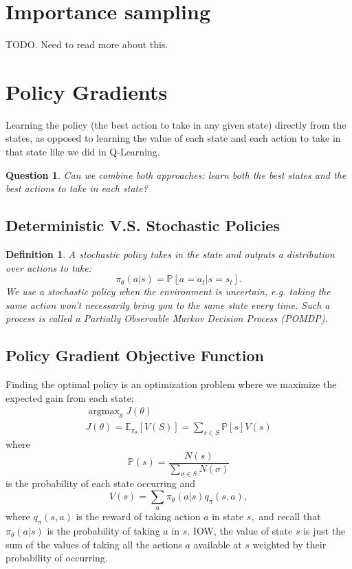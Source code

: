 \documentclass[20pt]{extarticle}
\theoremstyle{plain}
\newtheorem{question}[theorem]{Question}
\newtheorem{definition}[theorem]{Definition}
\theoremstyle{definition}
\theoremstyle{remark}
\DeclareMathOperator{\argmax}{argmax}
\newcommand{\hE}{\mathbb E}
\newcommand{\hP}{\mathbb P}
\newcommand{\0}{\varnothing}
\newcommand{\<}{\langle}
\renewcommand{\>}{\rangle}
\begin{document}
\section{Importance sampling}

TODO. Need to read more about this.


\section{Policy Gradients}

Learning the policy (the best action to take in any given state) directly from the states, as opposed to learning the value of each state and each action to take in that state like we did in Q-Learning.

\begin{question}
  Can we combine both approaches: learn both the best states and the best actions to take in each state?
\end{question}

\subsection{Deterministic V.S. Stochastic Policies}

\begin{definition}
  A stochastic policy takes in the state and outputs a distribution over actions to take: $$
  \pi_\theta(a|s) = \hP[a = a_t | s = s_t].
$$ We use a stochastic policy when the environment is uncertain, e.g. taking the same action won't necessarily bring you to the same state every time. Such a process is called a Partially Observable Markov Decision Process (POMDP).
\end{definition}

\subsection{Policy Gradient Objective Function}

Finding the optimal policy is an optimization problem where we maximize the expected gain from each state:
\begin{gather*}
\argmax_\theta  J(\theta) \\
J(\theta) = \hE_{\pi_\theta}[V(S)] = \sum_{s\in S} \hP[s] V(s)
\end{gather*}
where $$
  \hP(s) = \frac{N(s)}{\sum_{\sigma\in S} N(\sigma)}
$$
is the probability of each state occurring and $$
  V(s) = \sum_{a} \pi_\theta(a|s) q_\pi(s, a),
$$
where $ q_\pi(s, a) $ is the reward of taking action $ a $ in state $ s, $ and recall that $ \pi_\theta(a|s) $ is the probability of taking $ a $ in $ s. $ IOW, the value of state $ s $ is just the sum of the values of taking all the actions $ a $ available at $ s $ weighted by their probability of occurring.
\end{document}
